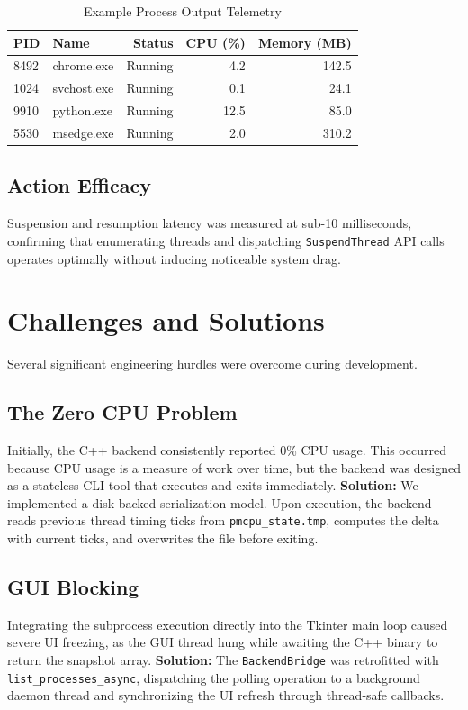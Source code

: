 \documentclass{article}
\begin{document}
\begin{table}[h]
\caption{Example Process Output Telemetry}
\centering
\begin{tabular}{llrrr}
\toprule
\textbf{PID} & \textbf{Name} & \textbf{Status} & \textbf{CPU (\%)} & \textbf{Memory (MB)} \\
\midrule
8492 & chrome.exe & Running & 4.2 & 142.5 \\
1024 & svchost.exe & Running & 0.1 & 24.1 \\
9910 & python.exe & Running & 12.5 & 85.0 \\
5530 & msedge.exe & Running & 2.0 & 310.2 \\
\bottomrule
\end{tabular}
\end{table}

\subsection{Action Efficacy}
Suspension and resumption latency was measured at sub-10 milliseconds, confirming that enumerating threads and dispatching \texttt{SuspendThread} API calls operates optimally without inducing noticeable system drag.

\section{Challenges and Solutions}
Several significant engineering hurdles were overcome during development.

\subsection{The Zero CPU Problem}
Initially, the C++ backend consistently reported 0\% CPU usage. This occurred because CPU usage is a measure of work over time, but the backend was designed as a stateless CLI tool that executes and exits immediately. 
\textbf{Solution:} We implemented a disk-backed serialization model. Upon execution, the backend reads previous thread timing ticks from \texttt{pmcpu\_state.tmp}, computes the delta with current ticks, and overwrites the file before exiting. 

\subsection{GUI Blocking}
Integrating the subprocess execution directly into the Tkinter main loop caused severe UI freezing, as the GUI thread hung while awaiting the C++ binary to return the snapshot array.
\textbf{Solution:} The \texttt{BackendBridge} was retrofitted with \texttt{list\_processes\_async}, dispatching the polling operation to a background daemon thread and synchronizing the UI refresh through thread-safe callbacks.
\end{document}
